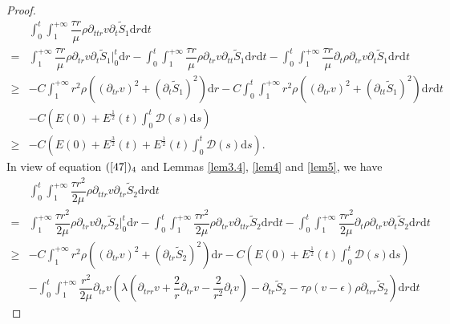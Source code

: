 \documentclass[10pt,reqno]{amsart}
\numberwithin{equation}{section}
\begin{document}
\begin{proof}
		\begin{equation}\nonumber
			\begin{aligned}
				&\int_{0}^{t}\int_{1}^{+\infty}\dfrac{\tau r}{\mu}\rho \partial_{ttr}v \partial_{t}\tilde{S}_1\mathrm{d}r\mathrm{d}t\\
				=&
				\int_{1}^{+\infty}\dfrac{\tau r}{\mu}\rho \partial_{tr}v \partial_{t}\tilde{S}_1\big|_0^{t}\mathrm{d}r
				-\int_{0}^{t}\int_{1}^{+\infty}\dfrac{\tau r}{\mu}\rho \partial_{tr}v \partial_{tt}\tilde{S}_1\mathrm{d}r\mathrm{d}t
				-\int_{0}^{t}\int_{1}^{+\infty}\dfrac{\tau r}{\mu}\partial_{t}\rho \partial_{tr}v \partial_{t}\tilde{S}_1\mathrm{d}r\mathrm{d}t\\
				\geq&
				-C\int_{1}^{+\infty}r^2\rho((\partial_{tr}v)^2+(\partial_{t}\tilde{S}_1)^2)\mathrm{d}r
				-C\int_{0}^{t}\int_{1}^{+\infty}r^2\rho((\partial_{tr}v)^2+(\partial_{tt}\tilde{S}_1)^2)\mathrm{d}r\mathrm{d}t\\&
				-C\left(E(0)+ E^{\frac{1}{2}}(t) \int_{0}^{t}\mathcal{D}(s)\mathrm{d}s\right)\\
				\geq&-C\left(E(0)+ E^{\frac{3}{2}}(t)+ E^{\frac{1}{2}}(t) \int_{0}^{t}\mathcal{D}(s)\mathrm{d}s\right).
			\end{aligned}
		\end{equation}
		In view of equation $(\ref{47})_4$ and Lemmas \ref{lem3.4}, \ref{lem4} and \ref{lem5}, we have	
		\begin{equation}\nonumber
			\begin{aligned}
				&\int_{0}^{t}\int_{1}^{+\infty}\dfrac{\tau r^2}{2\mu}\rho \partial_{ttr}v \partial_{tr}\tilde{S}_2\mathrm{d}r\mathrm{d}t\\
				=&
				\int_{1}^{+\infty}\dfrac{\tau r^2}{2\mu}\rho \partial_{tr}v \partial_{tr}\tilde{S}_2\big|_0^t\mathrm{d}r
				-\int_{0}^{t}\int_{1}^{+\infty}\dfrac{\tau r^2}{2\mu}\rho \partial_{tr}v \partial_{ttr}\tilde{S}_2\mathrm{d}r\mathrm{d} t
				-\int_{0}^{t}\int_{1}^{+\infty}\dfrac{\tau r^2}{2\mu}\partial_{t}\rho \partial_{tr}v \partial_{t}\tilde{S}_2\mathrm{d}r\mathrm{d} t\\
				\geq &
				-C\int_{1}^{+\infty}r^2\rho ((\partial_{tr}v)^2+ (\partial_{tr}\tilde{S}_2)^2)\mathrm{d}r
				-C(E(0)+E^{\frac{1}{2}}(t) \int_{0}^{t}\mathcal{D}(s)\mathrm{d}s)\\
				&-\int_{0}^{t}\int_{1}^{+\infty}\dfrac{r^2}{2\mu}\partial_{tr}v
				\left(\lambda(\partial_{trr} v+\dfrac{2}{r}\partial_{tr} v
				-\dfrac{2}{r^2} \partial_{t}v)-\partial_{tr} \tilde{S}_2
				-\tau \rho (v-\epsilon)\rho\partial_{trr}\tilde{S}_2\right)\mathrm{d}r\mathrm{d} t

\end{aligned}
\end{equation}
\end{proof}
\end{document}
